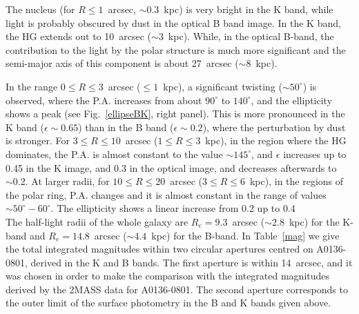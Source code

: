 \documentclass[useAMS,usenatbib]{mn2e}
\begin{document}
The nucleus (for $R\le1$~arcsec, $\sim0.3$~kpc) is very bright in the
K band, while light is probably obscured by dust in the optical B band
image. In the K band, the HG  extends out
to 10~arcsec ($\sim3$~kpc). While, in the optical B-band, the
contribution to the light by the polar structure is much more
significant and the semi-major axis of this component is about
27~arcsec ($\sim$8~kpc).

In the range $0\leq R \leq 3$~arcsec ($\leq 1$~kpc), a significant
twisting ($\sim50^{\circ}$) is observed, where the P.A. increases from about 
$ 90^{\circ}$ to $ 140^{\circ}$, and the ellipticity shows a
peak (see Fig.~\ref{ellipseBK}, right panel). This is more pronounced
in the K band ($\epsilon \sim0.65$) than in the B band
($\epsilon \sim0.2$), where the perturbation by dust is stronger.
%
For $3\leq R \leq 10$~arcsec ($1 \leq R \leq 3$~kpc), in the region
where the HG dominates, the P.A. is almost constant to the value
$\sim145^{\circ}$, and $\epsilon$ increases up to 0.45 in the K image,
and 0.3 in the optical image, and decreases afterwards to $\sim0.2$.
%
At larger radii, for $10\leq R \leq 20$~arcsec ($3\leq R \leq 6$~kpc),
in the regions of the polar ring, P.A. changes and it is almost
constant in the range of values $\sim50^{\circ}-60^{\circ}$. The
ellipticity shows a linear increase from 0.2 up to 0.4\\

The half-light radii of the whole galaxy are $R_{e}=9.3$~arcsec ($\sim2.8$~kpc) for the
K-band and $R_{e}=14.8$~arcsec ($\sim4.4$~kpc) for the B-band. In
Table~\ref{mag} we give the total integrated magnitudes within two
circular apertures centred on A0136-0801, derived in the K and B
bands. The first aperture is within 14~arcsec, and it was chosen in
order to make the comparison with the integrated magnitudes derived by
the 2MASS data for A0136-0801. The second aperture corresponds to the
outer limit of the surface photometry in the B and K bands given
above.
\end{document}

